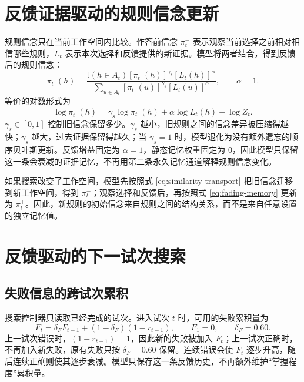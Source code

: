 \documentclass[12pt]{article}
\newcommand{\ind}{\mathbb I}
\begin{document}
\section{反馈证据驱动的规则信念更新}

规则信念只在当前工作空间内比较。作答前信念 $\pi_t^{-}$ 表示观察当前选择之前相对相信哪些规则，$L_t$ 表示本次选择和反馈提供的新证据。模型将两者结合，得到反馈后的规则信念：
\begin{equation}
\pi_t^{+}(h)
=
\frac{
\ind(h\in A_t)
[\pi_t^{-}(h)]^{\gamma_s}
[L_t(h)]^{\alpha}
}{
\sum_{u\in A_t}
[\pi_t^{-}(u)]^{\gamma_s}
[L_t(u)]^{\alpha}
},
\qquad
\alpha=1.
\label{eq:fading-memory}
\end{equation}
等价的对数形式为
\begin{equation}
\log\pi_t^{+}(h)
=\gamma_s\log\pi_t^{-}(h)+\alpha\log L_t(h)-\log Z_t.
\label{eq:fading-memory-log}
\end{equation}
$\gamma_s\in[0,1]$ 控制旧信念保留多少。$\gamma_s$ 越小，旧规则之间的信念差异被压缩得越快；$\gamma_s$ 越大，过去证据保留得越久；当 $\gamma_s=1$ 时，模型退化为没有额外遗忘的顺序贝叶斯更新。反馈增益固定为 $\alpha=1$，静态记忆权重固定为 0，因此模型只保留这一条会衰减的证据记忆，不再用第二条永久记忆通道解释规则信念变化。

如果搜索改变了工作空间，模型先按照式 \eqref{eq:similarity-transport} 把旧信念迁移到新工作空间，得到 $\pi_t^{-}$；观察选择和反馈后，再按照式 \eqref{eq:fading-memory} 更新为 $\pi_t^{+}$。因此，新规则的初始信念来自规则之间的结构关系，而不是来自任意设置的独立记忆值。


\section{反馈驱动的下一试次搜索}

\subsection{失败信息的跨试次累积}

搜索控制器只读取已经完成的试次。进入试次 $t$ 时，可用的失败累积量为
\begin{equation}
F_t
=\delta_F F_{t-1}+(1-\delta_F)(1-r_{t-1}),
\qquad
F_1=0,
\qquad
\delta_F=0.60.
\label{eq:failure-accumulator}
\end{equation}
上一试次错误时，$(1-r_{t-1})=1$，因此新的失败被加入 $F_t$；上一试次正确时，不再加入新失败，原有失败只按 $\delta_F=0.60$ 保留。连续错误会使 $F_t$ 逐步升高，随后连续正确则使其逐步衰减。模型只保存这一条反馈历史，不再额外维护“掌握程度”累积量。
\end{document}

